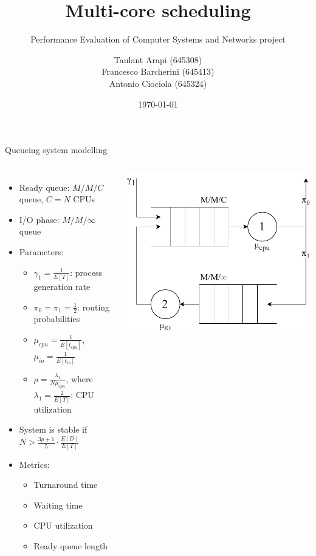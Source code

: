\documentclass[aspectratio=169,xcolor=dvipsnames]{beamer}
\title{Multi-core scheduling}
\subtitle{Performance Evaluation of Computer Systems and Networks project}
\author{Taulant Arapi (645308)\\Francesco Barcherini (645413)\\Antonio Ciociola (645324)}
\date{\today} %
\begin{document}
\begin{frame}
    \titlepage
\end{frame}


\begin{frame}{Queueing system modelling}
    \begin{columns}[c]
        \begin{itemize}
            \item Ready queue: $M/M/C$ queue, $C = N$ CPUs
            \item I/O phase: $M/M/\infty$ queue
            \item Parameters:
            \begin{itemize}
                \item $\gamma_1 = \frac{1}{E[T]}$: process generation rate
                \item $\pi_0 = \pi_1 = \frac{1}{2}$: routing probabilities
                \item $\mu_{cpu} = \frac{1}{E[t_{cpu}]}$, $\mu_{io} = \frac{1}{E[t_{io}]}$
                \item $\rho = \frac{\lambda_1}{N\mu_{cpu}}$, where $\lambda_1 = \frac{2}{E[T]}$: CPU utilization
            \end{itemize}
            \item System is stable if $N > \frac{3p+1}{5}\cdot \frac{E[D]}{E[T]}$
            \item Metrics:
            \begin{itemize}
                \item Turnaround time
                \item Waiting time
                \item CPU utilization
                \item Ready queue length
            \end{itemize}
        \end{itemize}
        \includegraphics[width=\textwidth]{files/queue_schema.pdf}

\end{columns}
\end{frame}
\end{document}
